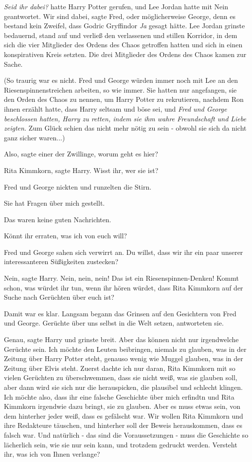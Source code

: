 \emph{Seid ihr dabei?} hatte Harry Potter gerufen, und Lee Jordan hatte mit Nein
geantwortet. \glqq{}Wir sind dabei\grqq{}, sagte Fred, oder möglicherweise
George, denn es bestand kein Zweifel, dass Godric Gryffindor\emph{ Ja} gesagt
hätte. Lee Jordan grinste bedauernd, stand auf und verließ den verlassenen und
stillen Korridor, in dem sich die vier Mitglieder des Ordens des Chaos getroffen
hatten und sich in einen konspirativen Kreis setzten. Die drei Mitglieder des
Ordens des Chaos kamen zur Sache.

(So traurig war es nicht. Fred und George würden immer noch mit Lee an den
Riesenspinnenstreichen arbeiten, so wie immer. Sie hatten nur angefangen, sie
den Orden des Chaos zu nennen, um Harry Potter zu rekrutieren, nachdem Ron ihnen
erzählt hatte, dass Harry seltsam und böse sei, und \emph{Fred und George
beschlossen hatten, Harry zu retten, indem sie ihm wahre Freundschaft und Liebe
zeigten.} Zum Glück schien das nicht mehr nötig zu sein - obwohl sie sich da
nicht ganz sicher waren...)

\glqq{}Also\grqq{}, sagte einer der Zwillinge, \glqq{}worum geht es hier?\grqq{}

\glqq{}Rita Kimmkorn\grqq{}, sagte Harry. \glqq{}Wisst ihr, wer sie ist?\grqq{}

Fred und George nickten und runzelten die Stirn.

\glqq{}Sie hat Fragen über mich gestellt.\grqq{}

Das waren keine guten Nachrichten.

\glqq{}Könnt ihr erraten, was ich von euch will?\grqq{}

Fred und George sahen sich verwirrt an. \glqq{}Du willst, dass wir ihr ein paar
unserer interessanteren Süßigkeiten zustecken?\grqq{}

\glqq{}Nein\grqq{}, sagte Harry. \glqq{}Nein, nein, nein! Das ist ein
Riesenspinnen-Denken! Kommt schon, was würdet ihr tun, wenn ihr hören würdet,
dass Rita Kimmkorn auf der Suche nach Gerüchten über euch ist?\grqq{}

Damit war es klar. Langsam begann das Grinsen auf den Gesichtern von Fred und
George. \glqq{}Gerüchte über uns selbst in die Welt setzen\grqq{}, antworteten
sie.

\glqq{}Genau\grqq{}, sagte Harry und grinste breit. \glqq{}Aber das können nicht
nur irgendwelche Gerüchte sein. Ich möchte den Leuten beibringen, niemals zu
glauben, was in der Zeitung über Harry Potter steht, genauso wenig wie Muggel
glauben, was in der Zeitung über Elvis steht. Zuerst dachte ich nur daran, Rita
Kimmkorn mit so vielen Gerüchten zu überschwemmen, dass sie nicht weiß, was sie
glauben soll, aber dann wird sie sich nur die herauspicken, die plausibel und
schlecht klingen. Ich möchte also, dass ihr eine falsche Geschichte über mich
erfindtn und Rita Kimmkorn irgendwie dazu bringt, sie zu glauben. Aber es muss
etwas sein, von dem hinterher jeder weiß, dass es gefälscht war. Wir wollen Rita
Kimmkorn und ihre Redakteure täuschen, und hinterher soll der Beweis
herauskommen, dass es falsch war. Und natürlich - das sind die Voraussetzungen -
muss die Geschichte so lächerlich sein, wie sie nur sein kann, und trotzdem
gedruckt werden. Versteht ihr, was ich von Ihnen verlange?\grqq{}


